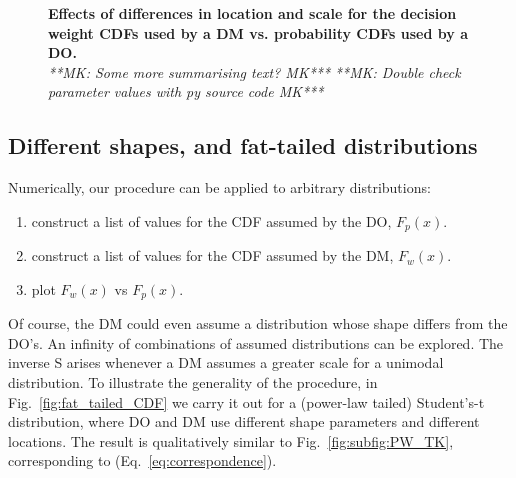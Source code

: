 \documentclass[a4paper, 12pt]{article}
\newcommand{\eref}[1]{(Eq.~\ref{eq:#1})}
\newcommand{\flabel}[1]{\label{fig:#1}}
\newcommand{\fref}[1]{Fig.~\ref{fig:#1}}
\newcommand{\seclabel}[1]{\label{sec:#1}}
\newcommand{\MK}[1]{{\it ***MK: #1 MK***}}
\begin{document}
\begin{figure}
\begin{center}
\caption{{\bf Effects of differences in location and scale for the decision weight CDFs used by a DM vs. probability CDFs used by a DO.}\\
\MK{Some more summarising text?}
\flabel{CDF_weights}
\MK{Double check parameter values with py source code}
}
\end{center}
\end{figure}

\FloatBarrier
\subsection{Different shapes, and fat-tailed distributions\seclabel{Different_shapes}}
Numerically, our procedure can be applied to arbitrary distributions: 
\begin{enumerate}
\item
construct a list of values for the CDF assumed by the DO, $F_p(x)$.
\item
construct a list of values for the CDF assumed by the DM, $F_w(x)$.
\item
plot $F_w(x)$ vs $F_p(x)$.
\end{enumerate}
Of course, the DM could even assume a distribution whose shape differs from the DO's. An infinity of combinations of assumed distributions can be explored. The inverse S arises whenever a DM assumes a greater scale for a unimodal distribution. To illustrate the generality of the procedure, in \fref{fat_tailed_CDF} we carry it out for a (power-law tailed) Student's-t distribution, where DO and DM use different shape parameters and different locations. The result is qualitatively similar to \fref{subfig:PW_TK}, corresponding to \eref{correspondence}. 
\end{document}
